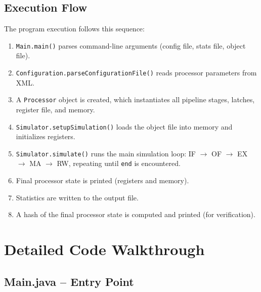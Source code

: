 \documentclass[12pt,a4paper]{article}
\begin{document}
\subsection{Execution Flow}

The program execution follows this sequence:

\begin{enumerate}
    \item \texttt{Main.main()} parses command-line arguments (config file, stats file, object file).
    \item \texttt{Configuration.parseConfigurationFile()} reads processor parameters from XML.
    \item A \texttt{Processor} object is created, which instantiates all pipeline stages, latches, register file, and memory.
    \item \texttt{Simulator.setupSimulation()} loads the object file into memory and initializes registers.
    \item \texttt{Simulator.simulate()} runs the main simulation loop: IF $\to$ OF $\to$ EX $\to$ MA $\to$ RW, repeating until \texttt{end} is encountered.
    \item Final processor state is printed (registers and memory).
    \item Statistics are written to the output file.
    \item A hash of the final processor state is computed and printed (for verification).
\end{enumerate}

\section{Detailed Code Walkthrough}

\subsection{Main.java -- Entry Point}
\end{document}
